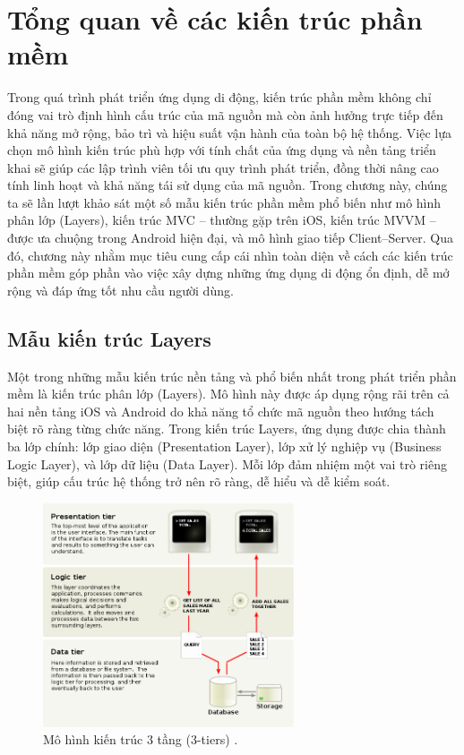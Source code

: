 \section{Tổng quan về các kiến trúc phần mềm}


  \hspace*{0.8cm}Trong quá trình phát triển ứng dụng di động, kiến trúc phần mềm không chỉ đóng vai trò định hình cấu trúc của mã nguồn mà còn ảnh hưởng trực tiếp đến khả năng mở rộng, bảo trì và hiệu suất vận hành của toàn bộ hệ thống. Việc lựa chọn mô hình kiến trúc phù hợp với tính chất của ứng dụng và nền tảng triển khai sẽ giúp các lập trình viên tối ưu quy trình phát triển, đồng thời nâng cao tính linh hoạt và khả năng tái sử dụng của mã nguồn. Trong chương này, chúng ta sẽ lần lượt khảo sát một số mẫu kiến trúc phần mềm phổ biến như mô hình phân lớp (Layers), kiến trúc MVC – thường gặp trên iOS, kiến trúc MVVM – được ưa chuộng trong Android hiện đại, và mô hình giao tiếp Client–Server. Qua đó, chương này nhằm mục tiêu cung cấp cái nhìn toàn diện về cách các kiến trúc phần mềm góp phần vào việc xây dựng những ứng dụng di động ổn định, dễ mở rộng và đáp ứng tốt nhu cầu người dùng.


\subsection{Mẫu kiến trúc Layers}
\renewcommand{\labelitemi}{--}    

    \hspace*{0.8cm}Một trong những mẫu kiến trúc nền tảng và phổ biến nhất trong phát triển phần mềm là kiến trúc phân lớp (Layers). Mô hình này được áp dụng rộng rãi trên cả hai nền tảng iOS và Android do khả năng tổ chức mã nguồn theo hướng tách biệt rõ ràng từng chức năng. Trong kiến trúc Layers, ứng dụng được chia thành ba lớp chính: lớp giao diện (Presentation Layer), lớp xử lý nghiệp vụ (Business Logic Layer), và lớp dữ liệu (Data Layer). Mỗi lớp đảm nhiệm một vai trò riêng biệt, giúp cấu trúc hệ thống trở nên rõ ràng, dễ hiểu và dễ kiểm soát.


\begin{figure}[H]
    \centering
    \includegraphics[width=0.66\textwidth]{images/layer.png}
    \caption{Mô hình kiến trúc 3 tầng (3-tiers) \cite{viquynhMVC2}.}
    \label{fig:fig11}
  \end{figure}
    
